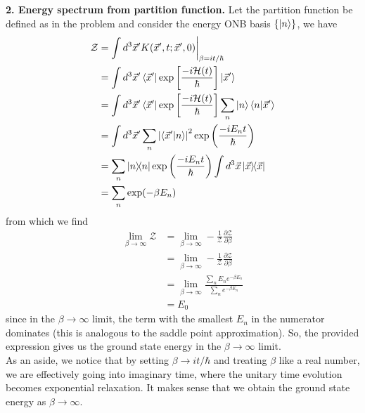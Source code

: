 \documentclass{article}
\theoremstyle{definition}
\newcommand{\p}{\partial}
\newcommand{\ham}{\mathcal{H}}
\newcommand{\be}{\beta}
\newcommand{\f}[2]{\frac{#1}{#2}}
\newcommand{\lp}{\left(}
\newcommand{\rp}{\right)}
\newcommand{\lb}{\left[}
\newcommand{\rb}{\right]}
\begin{document}
	
	
	
	
\noindent \textbf{2. Energy spectrum from partition function.} Let the partition function be defined as in the problem and consider the energy ONB basis $\{\ket{n}\}$, we have
\begin{align*}
\mathcal{Z} 
&= \int d^3 \vec{x}' K(\vec{x}',t;\vec{x}',0)\bigg\vert_{\be=it/\hbar}\\
&= \int d^3 \vec{x}' \bra{\vec{x}'} \exp\lb \f{-i \ham(t)}{\hbar}  \rb\ket{\vec{x}'}\\
&= \int d^3 \vec{x}' \bra{\vec{x}'} \exp\lb \f{-i \ham(t)}{\hbar}   \rb \sum_{n}\ket{n}\bra{n}\ket{\vec{x}'}\\
&= \int d^3\vec{x}' \sum_n \abs{\bra{\vec{x}'}\ket{n}}^2 \exp\lp \f{-i E_n t}{\hbar} \rp \\
&= \sum_n \ketbra{n} \exp\lp \f{-i E_n t}{\hbar} \rp \int d^3 \vec{x} \ketbra{\vec{x}} \\
&= \sum_n \exp(-\be E_n)
\end{align*}
from which we find
\begin{align*}
\lim_{\be\to \infty}\mathcal{Z} 
&= \lim_{\be \to \infty} -\f {1}{\mathcal{Z}} \f{\p \mathcal{Z}}{\p \be}\\
&= \lim_{\be \to \infty} -\f {1}{\mathcal{Z}} \f{\p \mathcal{Z}}{\p \be}\\
&= \lim_{\be\to\infty} \f{\sum_n E_n e^{-\be E_n}}{\sum_n e^{-\be E_n}}\\
&= E_0
\end{align*}
since in the $\be\to \infty$ limit, the term with the smallest $E_n$ in the numerator dominates (this is analogous to the saddle point approximation). So, the provided expression gives us the ground state energy in the $\be\to \infty$ limit. \\

As an aside, we notice that by setting $\be \to it/\hbar$ and treating $\be$ like a real number, we are effectively going into imaginary time, where the unitary time evolution becomes exponential relaxation. It makes sense that we obtain the ground state energy as $\be\to \infty$. \\ 
\end{document}
